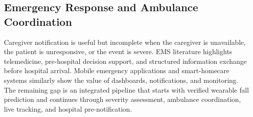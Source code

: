 \subsection{Emergency Response and Ambulance Coordination}
Caregiver notification is useful but incomplete when the caregiver is unavailable, the patient is unresponsive, or the event is severe. EMS literature highlights telemedicine, pre-hospital decision support, and structured information exchange before hospital arrival. Mobile emergency applications and smart-homecare systems similarly show the value of dashboards, notifications, and monitoring. The remaining gap is an integrated pipeline that starts with verified wearable fall prediction and continues through severity assessment, ambulance coordination, live tracking, and hospital pre-notification.
